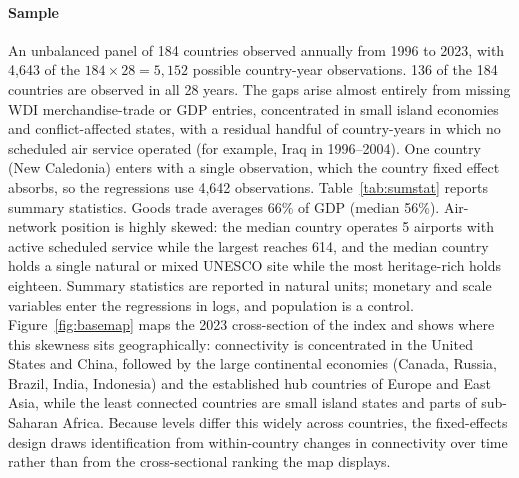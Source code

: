 \paragraph{\textbf{Sample}} An unbalanced panel of 184 countries observed annually from 1996 to 2023, with 4{,}643 of the $184\times28=5{,}152$ possible country-year observations. 136 of the 184 countries are observed in all 28
years. The gaps arise almost entirely from missing WDI merchandise-trade or
GDP entries, concentrated in small island economies and conflict-affected
states, with a residual handful of country-years in which no scheduled air
service operated (for example, Iraq in 1996--2004). One country (New
Caledonia) enters with a single observation, which the country fixed effect
absorbs, so the regressions use 4{,}642 observations. Table~\ref{tab:sumstat}
reports summary statistics. Goods trade averages 66\% of GDP (median 56\%). Air-network
position is highly skewed: the median country operates 5 airports with active
scheduled service while the largest reaches 614, and the median country holds a
single natural or mixed UNESCO site while the most heritage-rich holds eighteen.
Summary statistics are reported in natural units; monetary and scale variables
enter the regressions in logs, and population is a control.
Figure~\ref{fig:basemap} maps the 2023 cross-section of the index and shows
where this skewness sits geographically: connectivity is concentrated in the
United States and China, followed by the large continental economies (Canada,
Russia, Brazil, India, Indonesia) and the established hub countries of Europe
and East Asia, while the least connected countries are small island states and
parts of sub-Saharan Africa. Because levels differ this widely across
countries, the fixed-effects design draws identification from within-country
changes in connectivity over time rather than from the cross-sectional ranking
the map displays.

